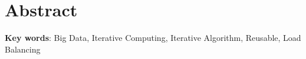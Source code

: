 \chapter*{Abstract}

\lipsum[1-3]

\textbf{Key words}:  Big Data, Iterative Computing, Iterative Algorithm, Reusable, Load Balancing